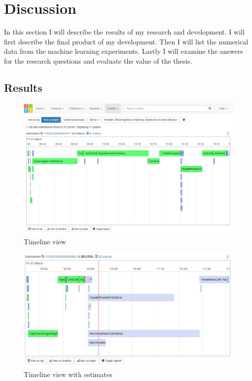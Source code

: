 
\clearpage
\section{Discussion}
\label{sec:discussion}

In this section I will describe the results of my research and development.
I will first describe the final product of my development.
Then I will list the numerical data from the machine learning experiments.
Lastly I will examine the answers for the research questions and
evaluate the value of the thesis. 

\subsection{Results}


\begin{figure}[htb]
\centering \includegraphics[width=\linewidth]{gfx/timeline.png}
\caption{Timeline view \label{fig:timeline}}
\end{figure}

\begin{figure}[htb]
\centering \includegraphics[width=\linewidth]{gfx/estimates.jpg}
\caption{Timeline view with estimates \label{fig:estimates}}
\end{figure}

